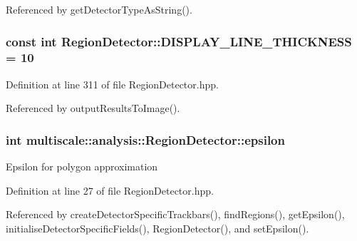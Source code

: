 \-Referenced by get\-Detector\-Type\-As\-String().

\hypertarget{classmultiscale_1_1analysis_1_1RegionDetector_aee6fbc641e8a6a85b1d877f9b4c6c6c3}{
\subsubsection[{\-D\-I\-S\-P\-L\-A\-Y\-\_\-\-L\-I\-N\-E\-\_\-\-T\-H\-I\-C\-K\-N\-E\-S\-S}]{\setlength{\rightskip}{0pt plus 5cm}const int {\bf \-Region\-Detector\-::\-D\-I\-S\-P\-L\-A\-Y\-\_\-\-L\-I\-N\-E\-\_\-\-T\-H\-I\-C\-K\-N\-E\-S\-S} = 10}}\label{classmultiscale_1_1analysis_1_1RegionDetector_aee6fbc641e8a6a85b1d877f9b4c6c6c3}


\-Definition at line 311 of file \-Region\-Detector.\-hpp.



\-Referenced by output\-Results\-To\-Image().

\hypertarget{classmultiscale_1_1analysis_1_1RegionDetector_acf21910fadd7c6ef2810743a78a0aeb9}{
\subsubsection[{epsilon}]{\setlength{\rightskip}{0pt plus 5cm}int {\bf multiscale\-::analysis\-::\-Region\-Detector\-::epsilon}}}\label{classmultiscale_1_1analysis_1_1RegionDetector_acf21910fadd7c6ef2810743a78a0aeb9}
\-Epsilon for polygon approximation 

\-Definition at line 27 of file \-Region\-Detector.\-hpp.



\-Referenced by create\-Detector\-Specific\-Trackbars(), find\-Regions(), get\-Epsilon(), initialise\-Detector\-Specific\-Fields(), \-Region\-Detector(), and set\-Epsilon().

